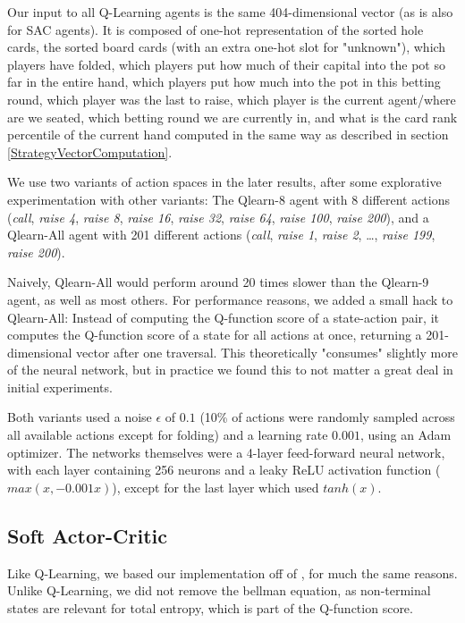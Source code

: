 Our input to all Q-Learning agents is the same 404-dimensional vector  (as is also for SAC agents). It is composed of one-hot representation of the sorted hole cards, the sorted board cards (with an extra one-hot slot for "unknown"), which players have folded, which players put how much of their capital into the pot so far in the entire hand, which players put how much into the pot in this betting round, which player was the last to raise, which player is the current agent/where are we seated, which betting round we are currently in, and what is the card rank percentile of the current hand computed in the same way as described in section \ref{StrategyVectorComputation}.

We use two variants of action spaces in the later results, after some explorative experimentation with other variants: The Qlearn-8 agent with 8 different actions (\textit{call}, \textit{raise 4}, \textit{raise 8}, \textit{raise 16}, \textit{raise 32}, \textit{raise 64}, \textit{raise 100}, \textit{raise 200}), and a Qlearn-All agent with 201 different actions (\textit{call}, \textit{raise 1}, \textit{raise 2}, \dots, \textit{raise 199}, \textit{raise 200}).

Naively, Qlearn-All would perform around 20 times slower than the Qlearn-9 agent, as well as most others. For performance reasons, we added a small hack to Qlearn-All: Instead of computing the Q-function score of a state-action pair, it computes the Q-function score of a state for all actions at once, returning a 201-dimensional vector after one traversal. This theoretically "consumes" slightly more of the neural network, but in practice we found this to not matter a great deal in initial experiments.

Both variants used a noise $\epsilon$ of $0.1$ (10\% of actions were randomly sampled across all available actions except for folding) and a learning rate $0.001$, using an Adam optimizer. The networks themselves were a 4-layer feed-forward neural network, with each layer containing 256 neurons and a leaky ReLU activation function ($max(x, -0.001x)$), except for the last layer which used $tanh(x)$.

\subsection{Soft Actor-Critic}
Like Q-Learning, we based our implementation off of \cite{SpinningUp2018}, for much the same reasons. Unlike Q-Learning, we did not remove the bellman equation, as non-terminal states are relevant for total entropy, which is part of the Q-function score.


